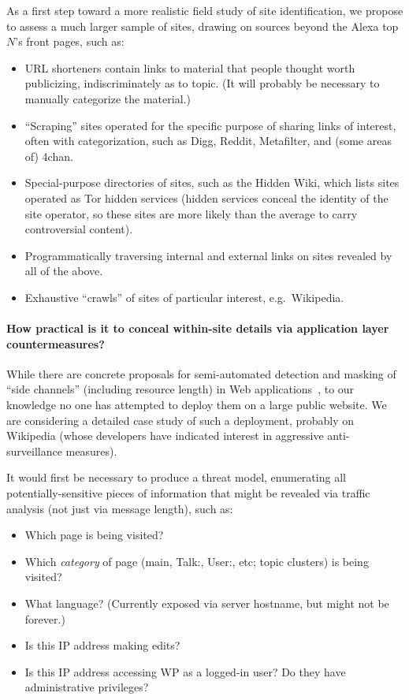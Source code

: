 \documentclass[oneside]{zarticle}
\begin{document}
\begin{multicols}{2}
As a first step toward a more realistic field study of site
identification, we propose to assess a much larger sample of sites,
drawing on sources beyond the Alexa top $N$'s front pages, such as:

\begin{itemize}
\item URL shorteners contain links to material that people thought
  worth publicizing, indiscriminately as to topic.  (It will probably
  be necessary to manually categorize the material.)
\item “Scraping” sites operated for the specific purpose of sharing
  links of interest, often with categorization, such as Digg, Reddit,
  Metafilter, and (some areas of) 4chan.
\item Special-purpose directories of sites, such as the Hidden Wiki,
  which lists sites operated as Tor hidden services (hidden services
  conceal the identity of the site operator, so these sites are more
  likely than the average to carry controversial content).
\item Programmatically traversing internal and external links on sites
  revealed by all of the above.
\item Exhaustive “crawls” of sites of particular interest, e.g.\ Wikipedia.
\end{itemize}

\paragraph{How practical is it to conceal within-site details via
  application layer countermeasures?} While there are concrete
proposals for semi-automated detection and masking of “side channels”
(including resource length) in Web
applications~\cite{backes2013sidechannel, chapman2011automated,
  zhang2010sidebuster}, to our knowledge no one has attempted to
deploy them on a large public website.  We are considering a detailed
case study of such a deployment, probably on Wikipedia (whose
developers have indicated interest in aggressive anti-surveillance
measures).

It would first be necessary to produce a threat model, enumerating all
potentially-sensitive pieces of information that might be revealed via
traffic analysis (not just via message length), such as:

\begin{itemize}
\item Which page is being visited?
\item Which \emph{category} of page (main, Talk:, User:, etc; topic
  clusters) is being visited?
\item What language? (Currently exposed via server hostname, but might
  not be forever.)
\item Is this IP address making edits?
\item Is this IP address accessing WP as a logged-in user? Do they
  have administrative privileges?
\end{itemize}


\end{multicols}
\end{document}
